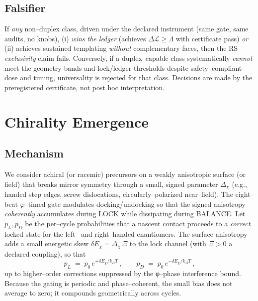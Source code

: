 \documentclass[11pt]{article}
\begin{document}
\subsection{Falsifier}\label{sec:uni-falsifier}
If \emph{any} non–duplex class, driven under the declared instrument (same gate, same audits, no knobs), (i) \emph{wins the ledger} (achieves $\Delta\mathcal{L}\ge\Lambda$ with certificate pass) \emph{or} (ii) achieves sustained templating \emph{without} complementary faces, then the RS \emph{exclusivity} claim fails. Conversely, if a duplex–capable class systematically \emph{cannot} meet the geometry bands and lock/ledger thresholds despite safety–compliant dose and timing, universality is rejected for that class. Decisions are made by the preregistered certificate, not post hoc interpretation.

\section{Chirality Emergence}\label{sec:chirality}

\subsection{Mechanism}\label{sec:chi-mech}
We consider achiral (or racemic) precursors on a weakly anisotropic surface (or field) that breaks mirror symmetry through a small, signed parameter $\Delta_{\chi}$ (e.g., handed step edges, screw dislocations, circularly–polarized near–field). The eight–beat $\varphi$–timed gate modulates docking/undocking so that the signed anisotropy \emph{coherently} accumulates during \textsf{LOCK} while dissipating during \textsf{BALANCE}. Let $p_L, p_D$ be the per–cycle probabilities that a nascent contact proceeds to a \emph{correct} locked state for the left– and right–handed enantiomers. The surface anisotropy adds a small energetic skew $\delta E_\chi=\Delta_{\chi}\,\Xi$ to the lock channel (with $\Xi>0$ a declared coupling), so that
\[
p_L\;=\;p_0\,e^{+\delta E_\chi/k_BT}\,,\qquad
p_D\;=\;p_0\,e^{-\delta E_\chi/k_BT}\,,
\]
up to higher–order corrections suppressed by the φ–phase interference bound. Because the gating is periodic and phase–coherent, the small bias does not average to zero; it compounds geometrically across cycles.
\end{document}
